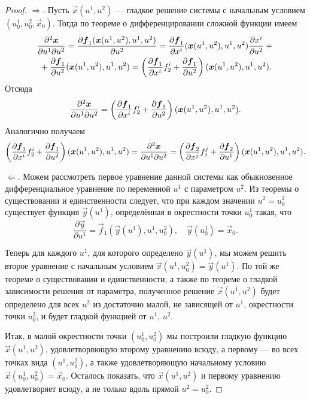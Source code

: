 \begin{proof}
	$\Rightarrow$. Пусть $\vec{x}(u^1, u^2)$ --- гладкое решение системы с начальным условием $(u^1_0, u^2_0, \vec{x}_0)$. Тогда по теореме о дифференцировании сложной функции имеем
	\begin{multline*}
		\frac{\partial^2\boldsymbol{x}}{\partial u^1\partial u^2} = \frac{\partial\boldsymbol{f}_1(\boldsymbol{x}(u^1, u^2), u^1, u^2)}{\partial u^2} = \frac{\partial\boldsymbol{f}_1}{\partial x^i}(\boldsymbol{x}(u^1, u^2), u^1, u^2)\frac{\partial x^i}{\partial u^2} + {}\\{} + \frac{\partial\boldsymbol{f}_1}{\partial u^2}(\boldsymbol{x}(u^1, u^2), u^1, u^2) = \left(\frac{\partial\boldsymbol{f}_1}{\partial x^i}f_2^i + \frac{\partial\boldsymbol{f}_1}{\partial u^2}\right)(\boldsymbol{x}(u^1, u^2), u^1, u^2).
	\end{multline*}
	Отсюда
	\[
		\frac{\partial^2\boldsymbol{x}}{\partial u^1\partial u^2} = \left(\frac{\partial\boldsymbol{f}_1}{\partial x^i}f_2^i + \frac{\partial\boldsymbol{f}_1}{\partial u^2}\right)(\boldsymbol{x}(u^1, u^2), u^1, u^2).
	\]
	Аналогично получаем
	\[
		\left(\frac{\partial\boldsymbol{f}_1}{\partial x^i}f_2^i + \frac{\partial\boldsymbol{f}_1}{\partial u^2}\right)(\boldsymbol{x}(u^1, u^2), u^1, u^2) = \frac{\partial^2\boldsymbol{x}}{\partial u^1\partial u^2} = \left(\frac{\partial\boldsymbol{f}_2}{\partial x^j}f_1^j + \frac{\partial\boldsymbol{f}_2}{\partial u^1}\right)(\boldsymbol{x}(u^1, u^2), u^1, u^2).
	\]

	$\Leftarrow$. Можем рассмотреть первое уравнение данной системы как обыкновенное дифференциальное уравнение по переменной $u^1$ с параметром $u^2$. Из теоремы о существовании и единственности следует, что при каждом значении $u^2 = u^2_0$ существует функция $\vec{y}(u^1)$, определённая в окрестности точки $u^1_0$ такая, что
	\[
		\frac{\partial\vec{y}}{\partial u^1} = \vec{f}_1(\vec{y}(u^1), u^1, u^2_0),\quad\vec{y}(u^1_0) = \vec{x}_0.
	\]

	Теперь для каждого $u^1$, для которого определено $\vec{y}(u^1)$, мы можем решить второе уравнение с начальным условием $\vec{x}(u^1, u_0^2) = \vec{y}(u^1)$. По той же теореме о существовании и единственности, а также по теореме о гладкой зависимости решения от параметра, полученное решение $\vec{x}(u^1, u^2)$ будет определено для всех $u^2$ из достаточно малой, не зависящей от $u^1$, окрестности точки $u^2_0$, и будет гладкой функцией от $u^1$, $u^2$.

	Итак, в малой окрестности точки $(u^1_0, u^2_0)$ мы построили гладкую функцию $\vec{x}(u^1, u^2)$, удовлетворяющую второму уравнению всюду, а первому --- во всех точках вида $(u^1, u^2_0)$, а также удовлетворяющую начальному условию $\vec{x}(u^1_0, u^2_0) = \vec{x}_0$. Осталось показать, что $\vec{x}(u^1, u^2)$ и первому уравнению удовлетворяет всюду, а не только вдоль прямой $u^2 = u^2_0$.


\end{proof}

